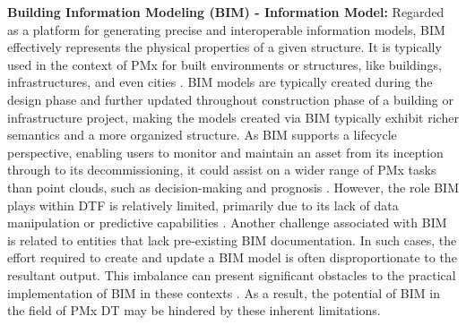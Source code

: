\documentclass[runningheads]{llncs}
\begin{document}
\textbf{Building Information Modeling (BIM) - Information Model:} Regarded as a platform for generating precise and interoperable information models, BIM effectively represents the physical properties of a given structure. It is typically used in the context of PMx for built environments or structures, like buildings, infrastructures, and even cities \cite{khajavi2019bim,lu2020bim}. BIM models are typically created during the design phase and further updated throughout construction phase of a building or infrastructure project, making the models created via BIM typically exhibit richer semantics and a more organized structure. As BIM supports a lifecycle perspective, enabling users to monitor and maintain an asset from its inception through to its decommissioning, it could assist on a wider range of PMx tasks than point clouds, such as decision-making and prognosis \cite{jiang2021digital,hichri2013point}. However, the role BIM plays within DTF is relatively limited, primarily due to its lack of data manipulation or predictive capabilities \cite{pan2021bim}. Another challenge associated with BIM is related to entities that lack pre-existing BIM documentation. In such cases, the effort required to create and update a BIM model is often disproportionate to the resultant output. This imbalance can present significant obstacles to the practical implementation of BIM in these contexts \cite{khajavi2019bim,arayici2008bim}. As a result, the potential of BIM in the field of PMx DT may be hindered by these inherent limitations.\\
\end{document}

